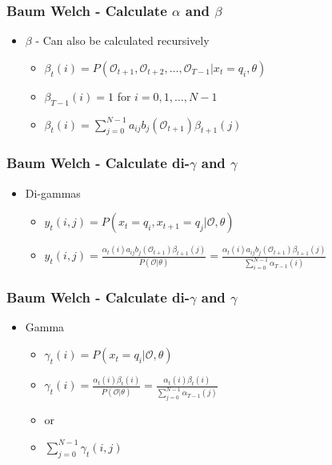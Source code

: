 \begin{frame}
	\frametitle{Baum Welch - Calculate $\alpha$ and $\beta$}
	\begin{itemize}
		\item $\beta$ - Can also be calculated recursively
		\begin{itemize}
			\item $\beta_t(i) = P(\mathcal{O}_{t+1}, \mathcal{O}_{t+2}, \dots, \mathcal{O}_{T-1} | x_t = q_i, \theta)$
			\item $\beta_{T-1}(i) = 1$ for $i = 0, 1, \dots, N-1$
			\item $\beta_t(i) = \sum\limits_{j=0}^{N-1} a_{ij} b_j(\mathcal{O}_{t+1}) \beta_{t+1}(j)$
		\end{itemize}
	\end{itemize}
\end{frame}

\begin{frame}
	\frametitle{Baum Welch - Calculate di-$\gamma$ and $\gamma$}
	\begin{itemize}
		\item Di-gammas
		\begin{itemize}
			\item $y_t(i,j) = P(x_t = q_i, x_{t+1} = q_j | \mathcal{O},\theta)$
			\item $y_t(i,j) = \frac{\alpha_t(i) a_{ij} b_j (\mathcal{O}_{t+1})\beta_{t+1}(j)}{P(\mathcal{O} | \theta)} = \frac{\alpha_t(i) a_{ij} b_j (\mathcal{O}_{t+1})\beta_{t+1}(j)}{\sum\limits_{i=0}^{N-1} \alpha_{T-1}(i)}$
		\end{itemize}
	\end{itemize}
\end{frame}

\begin{frame}
	\frametitle{Baum Welch - Calculate di-$\gamma$ and $\gamma$}
	\begin{itemize}
		\item Gamma
		\begin{itemize}
			\item $\gamma_t(i) = P(x_t = q_i|\mathcal{O},\theta)$
			\item $\gamma_t(i) = \frac{\alpha_t(i)\beta_t(i)}{P(\mathcal{O}|\theta)} = \frac{\alpha_t(i)\beta_t(i)}{\sum\limits_{j=0}^{N-1} \alpha_{T-1}(j)}$
			\item or
			\item $ \sum\limits_{j=0}^{N-1} \gamma_t(i,j)$
		\end{itemize}
	\end{itemize}
\end{frame}


